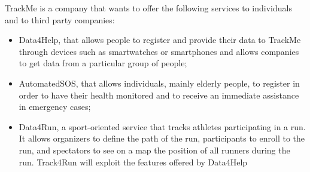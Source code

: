 TrackMe is a company that wants to offer the following services to individuals and to third party companies:
\begin{itemize}

\item Data4Help, that allows people to register and provide their data to TrackMe through devices such as smartwatches or smartphones and allows companies to get data from a particular group of people;

\item AutomatedSOS, that allows individuals, mainly elderly people, to register in order to have their health monitored and to receive an immediate assistance in emergency cases;

\item Data4Run, a sport-oriented service that tracks athletes participating in a run. It allows organizers to define the path of the run, participants to enroll to the run, and spectators to see on a map the position of all runners during the run. Track4Run will exploit the features offered by Data4Help

\end{itemize}